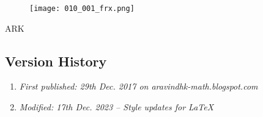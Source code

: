 \begin{figure}[H]
	\centering
	\texttt{[image: 010\_001\_frx.png]}
\end{figure}

ARK

\subsection{Version History}
\begin{enumerate}
	\item \emph{First published: 29th Dec. 2017 on aravindhk-math.blogspot.com}
	\item \emph{Modified: 17th Dec. 2023 -- Style updates for \LaTeX}
\end{enumerate}
